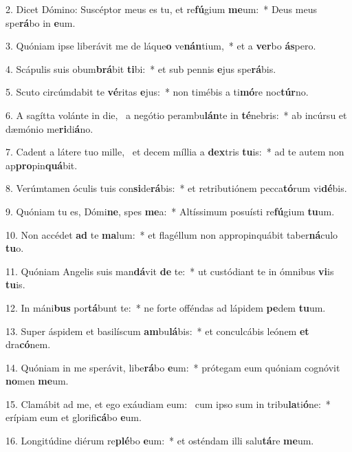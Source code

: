 2. Dicet Dómino: Suscéptor meus es tu, et re\textbf{fú}gium \textbf{me}um:~*  Deus meus spe\textbf{rá}bo in \textbf{e}um.\

3. Quóniam ipse liberávit me de láque\textbf{o} ve\textbf{nán}tium,~*  et a \textbf{ver}bo \textbf{ás}pero.\

4. Scápulis suis obum\textbf{brá}bit \textbf{ti}bi:~*  et sub pennis \textbf{e}jus spe\textbf{rá}bis.\

5. Scuto circúmdabit te \textbf{vé}ritas \textbf{e}jus:~*  non timébis a ti\textbf{mó}re noc\textbf{túr}no.\

6. A sagítta volánte in die, \dag\  a negótio perambu\textbf{lán}te in \textbf{té}nebris:~*  ab incúrsu et dæmónio me\textbf{ri}di\textbf{á}no.\

7. Cadent a látere tuo mille, \dag\  et decem míllia a \textbf{dex}tris \textbf{tu}is:~*  ad te autem non ap\textbf{pro}pin\textbf{quá}bit.\

8. Verúmtamen óculis tuis con\textbf{si}de\textbf{rá}bis:~*  et retributiónem pecca\textbf{tó}rum vi\textbf{dé}bis.\

9. Quóniam tu es, Dómi\textbf{ne}, spes \textbf{me}a:~*  Altíssimum posuísti re\textbf{fú}gium \textbf{tu}um.\

10. Non accédet \textbf{ad} te \textbf{ma}lum:~*  et flagéllum non appropinquábit taber\textbf{ná}culo \textbf{tu}o.\

11. Quóniam Angelis suis man\textbf{dá}vit \textbf{de} te:~*  ut custódiant te in ómnibus \textbf{vi}is \textbf{tu}is.\

12. In máni\textbf{bus} por\textbf{tá}bunt te:~*  ne forte offéndas ad lápidem \textbf{pe}dem \textbf{tu}um.\

13. Super áspidem et basilíscum \textbf{am}bu\textbf{lá}bis:~*  et conculcábis leónem \textbf{et} dra\textbf{có}nem.\

14. Quóniam in me sperávit, libe\textbf{rá}bo \textbf{e}um:~*  prótegam eum quóniam cognóvit \textbf{no}men \textbf{me}um.\

15. Clamábit ad me, et ego exáudiam eum: \dag\  cum ipso sum in tribu\textbf{la}ti\textbf{ó}ne:~*  erípiam eum et glorifi\textbf{cá}bo \textbf{e}um.\

16. Longitúdine diérum re\textbf{plé}bo \textbf{e}um:~*  et osténdam illi salu\textbf{tá}re \textbf{me}um.\

